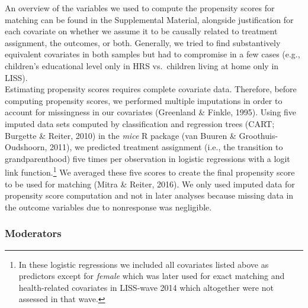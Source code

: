 \documentclass[
  english,
  man, noextraspace]{apa7}
\begin{document}
An overview of the variables we used to compute the propensity scores for matching can be found in the Supplemental Material, alongside justification for each covariate on whether we assume it to be causally related to treatment assignment, the outcomes, or both. Generally, we tried to find substantively equivalent covariates in both samples but had to compromise in a few cases (e.g., children's educational level only in HRS vs.~children living at home only in LISS).\\
Estimating propensity scores requires complete covariate data. Therefore, before computing propensity scores, we performed multiple imputations in order to account for missingness in our covariates (Greenland \& Finkle, 1995). Using five imputed data sets computed by classification and regression trees (CART; Burgette \& Reiter, 2010) in the \emph{mice} R package (van Buuren \& Groothuis-Oudshoorn, 2011), we predicted treatment assignment (i.e., the transition to grandparenthood) five times per observation in logistic regressions with a logit link function.\footnote{In these logistic regressions we included all covariates listed above as predictors except for \emph{female} which was later used for exact matching and health-related covariates in LISS-wave 2014 which altogether were not assessed in that wave.} We averaged these five scores to create the final propensity score to be used for matching (Mitra \& Reiter, 2016). We only used imputed data for propensity score computation and not in later analyses because missing data in the outcome variables due to nonresponse was negligible.

\hypertarget{moderators}{%
\subsubsection{Moderators}\label{moderators}}
\end{document}

